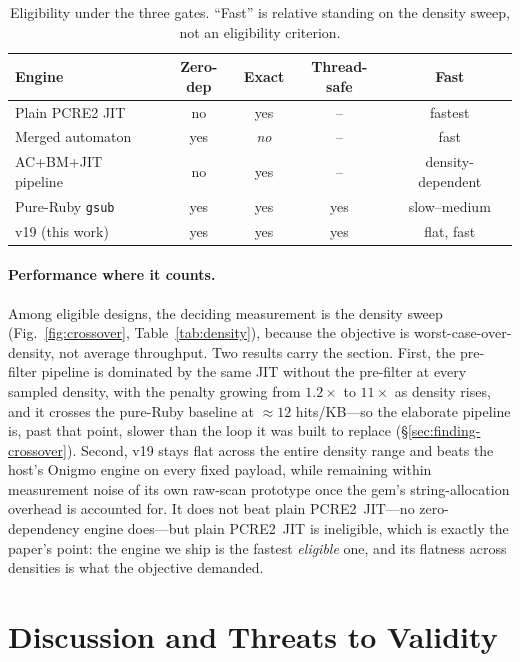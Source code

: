\documentclass[acmsmall,nonacm,screen]{acmart}
\begin{document}
\begin{table}[t]
  \centering
  \caption{Eligibility under the three gates. ``Fast'' is relative standing on the
  density sweep, not an eligibility criterion.}
  \label{tab:gates}
  \begin{tabular}{lcccc}
    \toprule
    Engine & Zero-dep & Exact & Thread-safe & Fast \\
    \midrule
    Plain PCRE2 JIT      & no  & yes & --  & fastest \\
    Merged automaton     & yes & \emph{no} & -- & fast \\
    AC+BM+JIT pipeline   & no  & yes & --  & density-dependent \\
    Pure-Ruby \texttt{gsub} & yes & yes & yes & slow--medium \\
    v19 (this work)      & yes & yes & yes & flat, fast \\
    \bottomrule
  \end{tabular}
\end{table}

\paragraph{Performance where it counts.} Among eligible designs, the deciding
measurement is the density sweep (Fig.~\ref{fig:crossover}, Table~\ref{tab:density}),
because the objective is worst-case-over-density, not average throughput. Two results
carry the section. First, the pre-filter pipeline is dominated by the same JIT
without the pre-filter at every sampled density, with the penalty growing from
\(1.2\times\) to \(11\times\) as density rises, and it crosses the pure-Ruby
baseline at \(\approx 12\) hits/KB---so the elaborate pipeline is, past that point,
slower than the loop it was built to replace (\S\ref{sec:finding-crossover}).
Second, v19 stays flat across the entire density range and beats the host's Onigmo
engine on every fixed payload, while remaining within measurement noise of its own
raw-scan prototype once the gem's string-allocation overhead is accounted for. It
does not beat plain PCRE2~JIT---no zero-dependency engine does---but plain PCRE2~JIT
is ineligible, which is exactly the paper's point: the engine we ship is the fastest
\emph{eligible} one, and its flatness across densities is what the objective
demanded.

\section{Discussion and Threats to Validity}
\label{sec:discussion}
\end{document}
